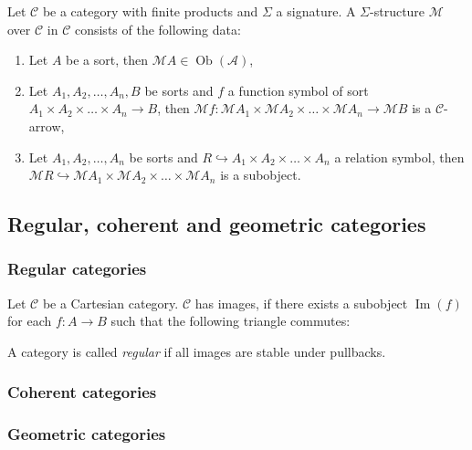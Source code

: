 \documentclass[a4paper]{article}
\theoremstyle{defin}
\theoremstyle{theorem}
\theoremstyle{claim}
\theoremstyle{prop}
\theoremstyle{lemma}
\theoremstyle{fact}
\theoremstyle{ex}
\theoremstyle{col}
\begin{document}
\vspace{\baselineskip}

Let $\mathcal{C}$ be a category with finite products and $\Sigma$ a signature. A $\Sigma$-structure $\mathcal{M}$ over $\mathcal{C}$ in $\mathcal{C}$ consists of the following data:
\begin{enumerate}
\item Let $A$ be a sort, then $\mathcal{M} A \in \operatorname{Ob}(\mathcal{A})$,
\item Let $A_1, A_2, \dots, A_n, B$ be sorts and $f$ a function symbol of sort $A_1 \times A_2 \times \dots \times A_n \to B$, then $\mathcal{M} f : \mathcal{M} A_1 \times \mathcal{M} A_2 \times \dots \times \mathcal{M} A_n \to \mathcal{M} B$ is a $\mathcal{C}$-arrow,
\item Let $A_1, A_2, \dots, A_n$ be sorts and $R \hookrightarrow A_1 \times A_2 \times \dots \times A_n$ a relation symbol, then $\mathcal{M} R \hookrightarrow \mathcal{M} A_1 \times \mathcal{M} A_2 \times \dots \times \mathcal{M} A_n$ is a subobject.
\end{enumerate}

\subsection{Regular, coherent and geometric categories}

\subsubsection{Regular categories}

Let $\mathcal{C}$ be a Cartesian category. $\mathcal{C}$ has images, if there exists a subobject
$\operatorname{Im}(f)$ for each $f : A \to B$ such that the following triangle commutes:

\centerline{
}

A category is called \emph{regular} if all images are stable under pullbacks.

\subsubsection{Coherent categories}

\subsubsection{Geometric categories}
\end{document}

